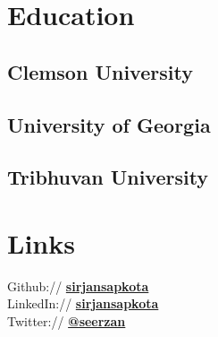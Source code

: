 \documentclass[]{deedy-resume-openfont}
\begin{document}
%
%
\lastupdated

%
%
%
%

\begin{minipage}[t]{0.31\textwidth} 
\section{Education} 
\subsection{Clemson University}
\sectionsep

\subsection{University of Georgia}
\sectionsep

\subsection{Tribhuvan University}
\sectionsep


\section{Links} 
Github:// \href{https://github.com/sirjansapkota}{\bf sirjansapkota} \\
LinkedIn:// \href{https://www.linkedin.com/in/sirjan-sapkota-09787049/}{\bf sirjansapkota} \\
Twitter://  \href{https://twitter.com/seerzan}{\bf @seerzan} \\


\end{minipage}
\end{document}
